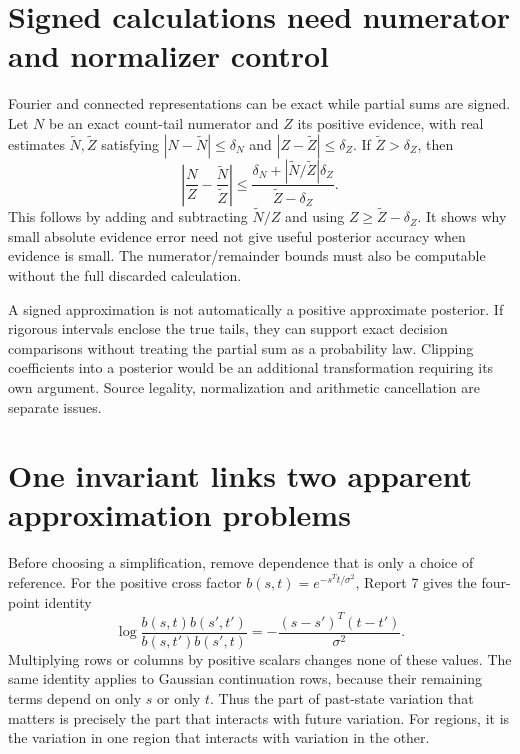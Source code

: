 \documentclass[10pt,a4paper]{article}
\begin{document}
\section{Signed calculations need numerator and normalizer control}
\label{sec:signed-foundation}
Fourier and connected representations can be exact while partial sums are signed. Let $N$ be an exact
count-tail numerator and $Z$ its positive evidence, with real estimates $\widetilde N,\widetilde Z$ satisfying
$|N-\widetilde N|\leq\delta_N$ and $|Z-\widetilde Z|\leq\delta_Z$. If $\widetilde Z>\delta_Z$, then
\begin{equation}
 \left|\frac NZ-\frac{\widetilde N}{\widetilde Z}\right|
 \leq\frac{\delta_N+|\widetilde N/\widetilde Z|\delta_Z}
             {\widetilde Z-\delta_Z}.
 \label{eq:ratio-error}
\end{equation}
This follows by adding and subtracting $\widetilde N/Z$ and using $Z\geq\widetilde Z-\delta_Z$.
It shows why small absolute evidence error need not give useful posterior accuracy when evidence is small.
The numerator/remainder bounds must also be computable without the full discarded calculation.

A signed approximation is not automatically a positive approximate posterior. If rigorous intervals enclose
the true tails, they can support exact decision comparisons without treating the partial sum as a probability
law. Clipping coefficients into a posterior would be an additional transformation requiring its own argument.
Source legality, normalization and arithmetic cancellation are separate issues.

\section{One invariant links two apparent approximation problems}
\label{sec:common-interaction}
Before choosing a simplification, remove dependence that is only a choice of reference. For the positive
cross factor $b(s,t)=e^{-s^Tt/\sigma^2}$, Report 7 gives the four-point identity
\begin{equation}
 \log\frac{b(s,t)b(s',t')}{b(s,t')b(s',t)}
 =-\frac{(s-s')^T(t-t')}{\sigma^2}.
 \label{eq:four-point}
\end{equation}
Multiplying rows or columns by positive scalars changes none of these values. The same identity applies to
Gaussian continuation rows, because their remaining terms depend on only $s$ or only $t$. Thus the part of
past-state variation that matters is precisely the part that interacts with future variation. For regions,
it is the variation in one region that interacts with variation in the other.
\end{document}
